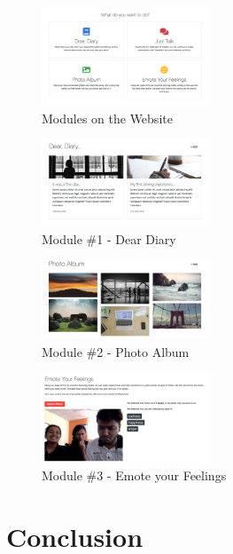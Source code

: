 \documentclass[conference,compsoc]{IEEEtran}
\begin{document}
\begin{figure}[H]
    \centering
    \includegraphics[width=5cm]{images/screenshots/website/website-modules.png}
    \caption{Modules on the Website}
\end{figure}

\begin{figure}[H]
    \centering
    \includegraphics[width=5cm]{images/screenshots/website/website-dear-diary.png}
    \caption{Module \#1 - Dear Diary}
\end{figure}

\begin{figure}[H]
    \centering
    \includegraphics[width=5cm]{images/screenshots/website/website-photo-album.png}
    \caption{Module \#2 - Photo Album}
\end{figure}

\begin{figure}[H]
    \centering
    \includegraphics[width=5cm]{images/screenshots/website/website-emote-feelings.png}
    \caption{Module \#3 - Emote your Feelings}
\end{figure}


\section{Conclusion}
\end{document}

